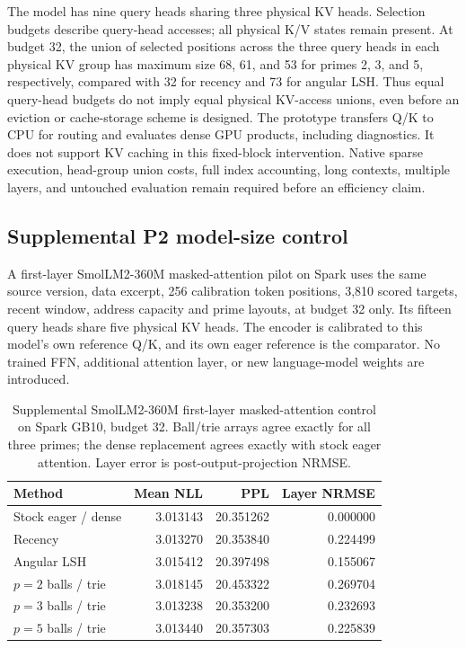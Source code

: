 \documentclass[11pt]{article}
\begin{document}
The model has nine query heads sharing three physical KV heads. Selection
budgets describe query-head accesses; all physical K/V states remain present.
At budget 32, the union of selected positions across the three query heads in
each physical KV group has maximum size 68, 61, and 53 for primes 2, 3, and 5,
respectively, compared with 32 for recency and 73 for angular LSH. Thus equal
query-head budgets do not imply equal physical KV-access unions, even before
an eviction or cache-storage scheme is designed.
The prototype transfers Q/K to CPU for routing and evaluates dense GPU products,
including diagnostics. It does not support KV caching in this fixed-block
intervention. Native sparse execution, head-group union costs, full index
accounting, long contexts, multiple layers, and untouched evaluation remain
required before an efficiency claim.

\subsection{Supplemental P2 model-size control}

A first-layer SmolLM2-360M masked-attention pilot on Spark uses the same source
version, data excerpt, 256 calibration token positions, 3,810 scored targets,
recent window, address capacity and prime layouts, at budget 32 only.
Its fifteen query heads share five physical KV heads. The encoder is calibrated
to this model's own reference Q/K, and its own eager reference is the comparator.
No trained FFN, additional attention layer, or new language-model weights are
introduced.

\begin{table}[htbp]
\centering
\small
\caption{Supplemental SmolLM2-360M first-layer masked-attention control on
Spark GB10, budget 32. Ball/trie arrays agree exactly for all three primes;
the dense replacement agrees exactly with stock eager attention. Layer error
is post-output-projection NRMSE.}
\begin{tabular}{lrrr}
\toprule
Method & Mean NLL & PPL & Layer NRMSE\\
\midrule
Stock eager / dense & 3.013143 & 20.351262 & 0.000000\\
Recency & 3.013270 & 20.353840 & 0.224499\\
Angular LSH & 3.015412 & 20.397498 & 0.155067\\
\(p=2\) balls / trie & 3.018145 & 20.453322 & 0.269704\\
\(p=3\) balls / trie & 3.013238 & 20.353200 & 0.232693\\
\(p=5\) balls / trie & 3.013440 & 20.357303 & 0.225839\\
\bottomrule
\end{tabular}
\label{tab:p2-360m}
\end{table}
\end{document}
